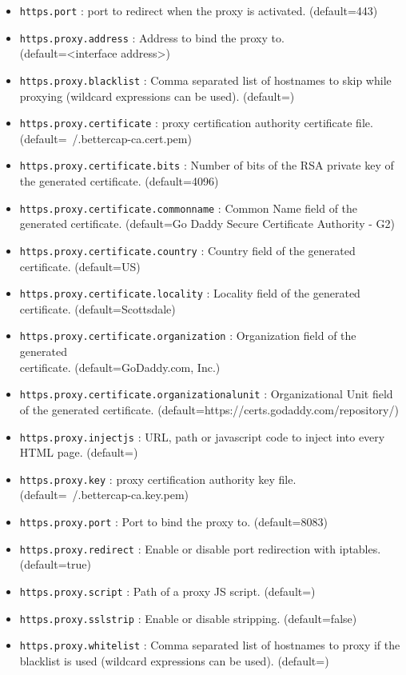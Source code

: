 \begin{itemize}
 \item \verb|https.port| :  port to redirect when the proxy is activated. (default=443)
 \item \verb|https.proxy.address| : Address to bind the  proxy to. \\ (default=<interface address>)
 \item \verb|https.proxy.blacklist| : Comma separated list of hostnames to skip while proxying (wildcard expressions can be used). (default=)
 \item \verb|https.proxy.certificate| :  proxy certification authority  certificate file. (default=~/.bettercap-ca.cert.pem)
 \item \verb|https.proxy.certificate.bits| : Number of bits of the RSA private key of the generated  certificate. (default=4096)
 \item \verb|https.proxy.certificate.commonname| : Common Name field of the generated  certificate. (default=Go Daddy Secure Certificate Authority - G2)
 \item \verb|https.proxy.certificate.country| : Country field of the generated  certificate. (default=US)
 \item \verb|https.proxy.certificate.locality| : Locality field of the generated \\  certificate. (default=Scottsdale)
 \item \verb|https.proxy.certificate.organization| : Organization field of the generated \\  certificate. (default=GoDaddy.com, Inc.)
 \item \verb|https.proxy.certificate.organizationalunit| : Organizational Unit field of the generated  certificate. \newline(default=https://certs.godaddy.com/repository/)
 \item \verb|https.proxy.injectjs| : URL, path or javascript code to inject into every HTML page. (default=)
 \item \verb|https.proxy.key| :  proxy certification authority  key file. (default=~/.bettercap-ca.key.pem)
 \item \verb|https.proxy.port| : Port to bind the  proxy to. (default=8083)
 \item \verb|https.proxy.redirect| : Enable or disable port redirection with iptables. (default=true)
 \item \verb|https.proxy.script| : Path of a proxy JS script. (default=)
 \item \verb|https.proxy.sslstrip| : Enable or disable  stripping. (default=false)
 \item \verb|https.proxy.whitelist| : Comma separated list of hostnames to proxy if the blacklist is used (wildcard expressions can be used). (default=)
\end{itemize}

